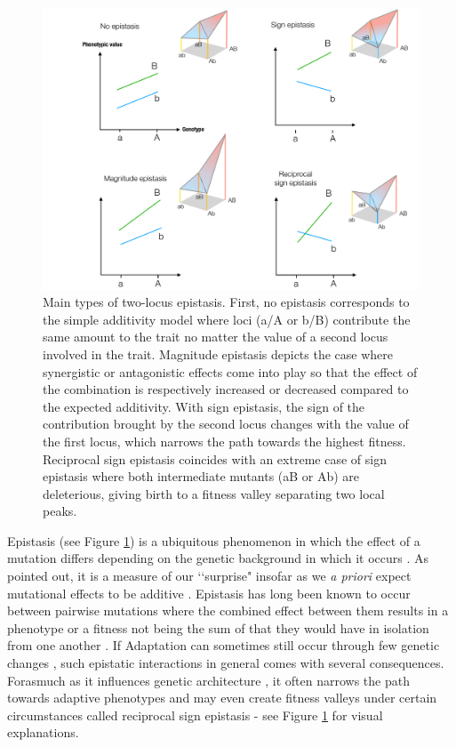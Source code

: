 \begin{figure}[h!]
    \centering
    \includegraphics[scale=0.45,trim=3cm 0cm 0cm 0cm,clip]{pics/Epistasis/2D-epistasis.pdf}
    \caption{Main types of two-locus epistasis. First, no epistasis corresponds to the simple additivity model where loci (a/A or b/B) contribute the same amount to the trait no matter the value of a second locus involved in the trait. Magnitude epistasis depicts the case where synergistic or antagonistic effects come into play so that the effect of the combination is respectively increased or decreased compared to the expected additivity. With sign epistasis, the sign of the contribution brought by the second locus changes with the value of the first locus, which narrows the path towards the highest fitness. Reciprocal sign epistasis coincides with an extreme case of sign epistasis where both intermediate mutants (aB or Ab) are deleterious, giving birth to a fitness valley separating two local peaks.}
    \label{fig:2D-epistasis}
    \vspace{-0.5cm}
\end{figure}

Epistasis (see Figure \ref{fig:2D-epistasis}) is a ubiquitous phenomenon in which the effect of a mutation differs depending on the genetic background in which it occurs \citep{Bateson09,Phillips08,Domingo19}. As \citet{Weinreich13} pointed out, it is a measure of our ‘‘surprise" insofar as we \textit{a priori} expect mutational effects to be additive \citep{Phillips08,Domingo19}. Epistasis has long been known to occur between pairwise mutations where the combined effect between them results in a phenotype or a fitness not being the sum of that they would have in isolation from one another \citep{Bateson09}. If Adaptation can sometimes still occur through few genetic changes \citep{Orr05}, such epistatic interactions in general comes with several consequences. Forasmuch as it influences genetic architecture \citep{Hermisson03,Domingo19,Sella19}, it often narrows the path towards adaptive phenotypes \citep{Poelwijk07} and may even create fitness valleys under certain circumstances called reciprocal sign epistasis \citep{Weinreich05b,Poelwijk11} - see Figure \ref{fig:2D-epistasis} for visual explanations.

